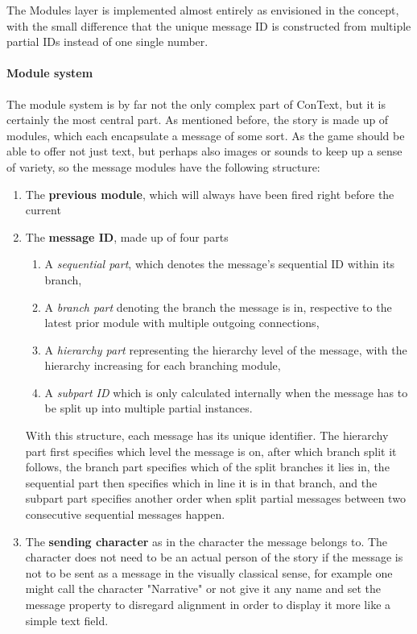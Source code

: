 The Modules layer is implemented almost entirely as envisioned in the concept, with the small difference that the unique message ID is constructed from multiple partial IDs instead of one single number.
\paragraph{Module system} The module system is by far not the only complex part of ConText, but it is certainly the most central part. As mentioned before, the story is made up of modules, which each encapsulate a message of some sort. As the game should be able to offer not just text, but perhaps also images or sounds to keep up a sense of variety, so the message modules have the following structure:
\begin{enumerate}
\item The \textbf{previous module}, which will always have been fired right before the current
\item The \textbf{message ID}, made up of four parts
	\begin{enumerate}
	\item A \textit{sequential part}, which denotes the message's sequential ID within its branch, 
	\item A \textit{branch part} denoting the branch the message is in, respective to the latest prior module with multiple outgoing connections, 
	\item A \textit{hierarchy part} representing the hierarchy level of the message, with the hierarchy increasing for each branching module, 
	\item A \textit{subpart ID} which is only calculated internally when the message has to be split up into multiple partial instances.
	\end{enumerate}
	With this structure, each message has its unique identifier. The hierarchy part first specifies which level the message is on, after which branch split it follows, the branch part specifies which of the split branches it lies in, the sequential part then specifies which in line it is in that branch, and the subpart part specifies another order when split partial messages between two consecutive sequential messages happen.
\item The \textbf{sending character} as in the character the message belongs to. The character does not need to be an actual person of the story if the message is not to be sent as a message in the visually classical sense, for example one might call the character "Narrative" or not give it any name and set the message property to disregard alignment in order to display it more like a simple text field.

\end{enumerate}
